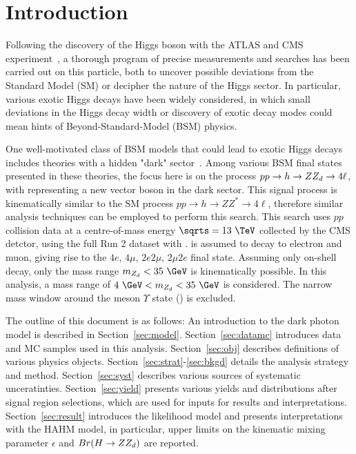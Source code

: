 \section{Introduction}

Following the discovery of the Higgs boson with the ATLAS and CMS experiment~\cite{paper:Aad:2012,paper:Chatrchyan:2012}, 
a thorough program of precise measurements and searches has 
been carried out on this particle, both to uncover possible deviations from the Standard Model (SM) or decipher the nature of the Higgs 
sector. In particular, various exotic Higgs decays have been widely considered, in which small deviations in the Higgs decay 
width or discovery of exotic decay modes could mean hints of Beyond-Standard-Model (BSM) physics.

One well-motivated class of BSM models that could lead to exotic Higgs decays includes theories with a hidden "dark" 
sector~\cite{Curtin:2014cca,Curtin:2013fra,Davoudiasl:2013aya,Davoudiasl:2012ag,Gopalakrishna:2008dv}.
Among various BSM final states presented in these theories,  
the focus here is on the process $p p \rightarrow h \rightarrow Z Z_d \rightarrow 4\ell$, with \zd 
representing a new vector boson in the dark sector. 
This signal process is kinematically similar to the SM process $p p \rightarrow h \rightarrow Z Z^* \rightarrow 4\ell$, 
therefore similar analysis techniques can be employed to perform this search. This search uses $pp$ collision data at a centre-of-mass energy 
$\sqrts = 13~\TeV$ collected by the CMS detctor, using the full Run 2 dataset with \usedLumi. \zd is assumed to decay to electron 
and muon, giving rise to the $4e$, $4\mu$, $2e2\mu$, $2\mu2e$ final state. Assuming only on-shell decay, only the mass range 
$\mass{\zd} < 35~\GeV$ is kinematically possible. In this analysis, a mass range of $4~\GeV < \mass{\zd} < 35~\GeV$ is considered. 
The narrow mass window around the meson $\Upsilon$ state (\mass{\Upsilon}) is excluded.

The outline of this document is as follows: An introduction to the dark photon model is described in Section~\ref{sec:model}. 
Section~\ref{sec:datamc} introduces data and MC samples used in this analysis.
Section~\ref{sec:obj} describes definitions of various physics objects. Section~\ref{sec:strat}-\ref{sec:bkgd} details 
the analysis strategy and method. Section~\ref{sec:syst} describes various sources of systematic unceratinties. 
Section~\ref{sec:yield} presents various yields and distributions after signal region selections, which are used for 
inputs for results and interpretations. Section~\ref{sec:result} introduces the likelihood model and presents interpretations 
with the HAHM model, in particular, upper limits on the kinematic mixing parameter $\epsilon$ and $Br(H \rightarrow Z Z_d)$ 
are reported.
